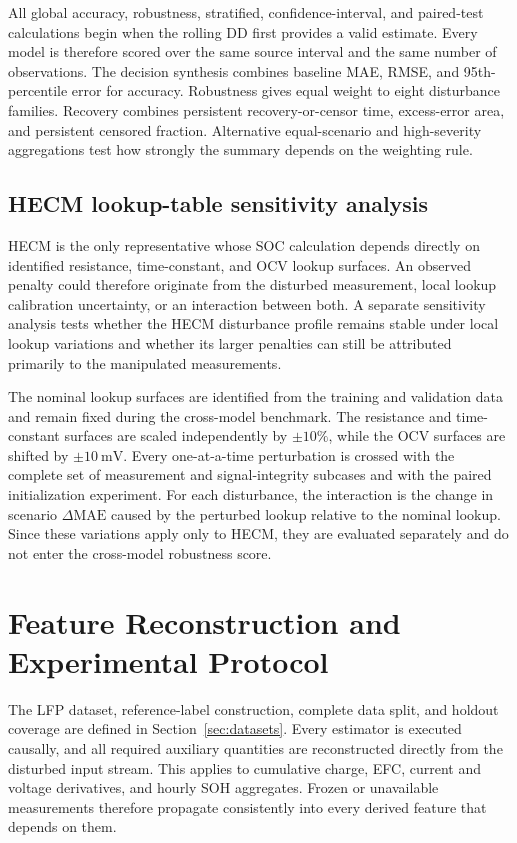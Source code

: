 All global accuracy, robustness, stratified, confidence-interval, and paired-test calculations begin when the rolling DD first provides a valid estimate. Every model is therefore scored over the same source interval and the same number of observations. The decision synthesis combines baseline MAE, RMSE, and 95th-percentile error for accuracy. Robustness gives equal weight to eight disturbance families. Recovery combines persistent recovery-or-censor time, excess-error area, and persistent censored fraction. Alternative equal-scenario and high-severity aggregations test how strongly the summary depends on the weighting rule.

\subsection{HECM lookup-table sensitivity analysis}
\label{sec:robustness_hecm_lookup_method}

HECM is the only representative whose SOC calculation depends directly on identified resistance, time-constant, and OCV lookup surfaces. An observed penalty could therefore originate from the disturbed measurement, local lookup calibration uncertainty, or an interaction between both. A separate sensitivity analysis tests whether the HECM disturbance profile remains stable under local lookup variations and whether its larger penalties can still be attributed primarily to the manipulated measurements.

The nominal lookup surfaces are identified from the training and validation data and remain fixed during the cross-model benchmark. The resistance and time-constant surfaces are scaled independently by $\pm10\%$, while the OCV surfaces are shifted by $\pm\SI{10}{\milli\volt}$. Every one-at-a-time perturbation is crossed with the complete set of measurement and signal-integrity subcases and with the paired initialization experiment. For each disturbance, the interaction is the change in scenario $\Delta\mathrm{MAE}$ caused by the perturbed lookup relative to the nominal lookup. Since these variations apply only to HECM, they are evaluated separately and do not enter the cross-model robustness score.

\section{Feature Reconstruction and Experimental Protocol}

The LFP dataset, reference-label construction, complete data split, and holdout coverage are defined in Section~\ref{sec:datasets}. Every estimator is executed causally, and all required auxiliary quantities are reconstructed directly from the disturbed input stream. This applies to cumulative charge, EFC, current and voltage derivatives, and hourly SOH aggregates. Frozen or unavailable measurements therefore propagate consistently into every derived feature that depends on them.

